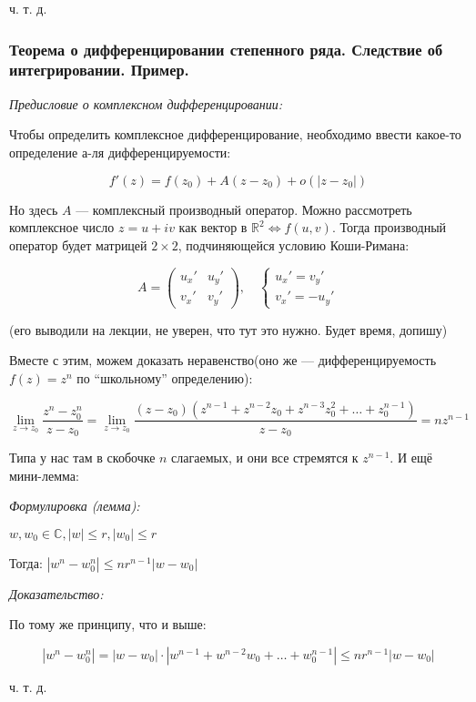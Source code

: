 \documentclass{article}
\begin{document}
ч. т. д. 


\subsubsection{Теорема о дифференцировании степенного ряда. Следствие об интегрировании. Пример.}

\textit{Предисловие о комплексном дифференцировании:} 

Чтобы определить комплексное дифференцирование, необходимо ввести какое-то определение а-ля дифференцируемости: 

\[f'(z) = f(z_0) + A(z - z_0) + o(|z - z_0|)\]

Но здесь $A$ --- комплексный производный оператор. Можно рассмотреть комплексное число $z = u + iv$ как вектор в $\mathbb{R}^2 \Leftrightarrow f(u, v)$. Тогда производный оператор будет матрицей $2 \times 2$, подчиняющейся условию Коши-Римана: 

\[A = \begin{pmatrix}
    u_x' & u_y' \\
    v_x' & v_y'
\end{pmatrix}, \quad \begin{cases}
    u_x' = v_y' \\
    v_x' = -u_y'
\end{cases}\]

(его выводили на лекции, не уверен, что тут это нужно. Будет время, допишу)

Вместе с этим, можем доказать неравенство(оно же --- дифференцируемость $f(z) = z^n$ по ``школьному'' определению):

\[ \lim_{z \rightarrow z_0}{\frac{z^n - z^n_0}{z - z_0}} = \lim_{z \rightarrow z_0}\frac{(z - z_0)(z^{n - 1} + z^{n - 2}z_0 + z^{n - 3}z^2_0 + \ldots + z^{n - 1}_0)}{z - z_0} = nz^{n - 1}\]

Типа у нас там в скобочке $n$ слагаемых, и они все стремятся к $z^{n - 1}$. И ещё мини-лемма:

\textit{Формулировка (лемма):}

$w, w_0 \in \mathbb{C}, |w| \le r, |w_0| \le r$

Тогда: $|w^n - w^n_0| \le nr^{n - 1} |w - w_0|$

\textit{Доказательство:}

По тому же принципу, что и выше: 

\[|w^n - w^n_0| = |w - w_0| \cdot |w^{n - 1} + w^{n - 2}w_0 + \ldots + w^{n - 1}_0| \le nr^{n - 1}|w - w_0|\]

ч. т. д. 
\end{document}
